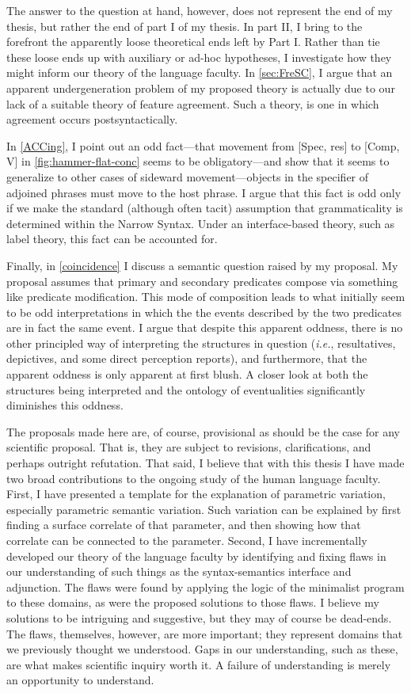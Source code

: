\documentclass[MilwayThesis]{subfiles}
\begin{document}
The answer to the question at hand, however, does not represent the end of my thesis, but rather the end of part I of my thesis.
In part II, I bring to the forefront the apparently loose theoretical ends left by Part I.
Rather than tie these loose ends up with auxiliary or ad-hoc hypotheses, I investigate how they might inform our theory of the language faculty.
In \cref{sec:FreSC}, I argue that an apparent undergeneration problem of my proposed theory is actually due to our lack of a suitable theory of feature agreement.
Such a theory, is one in which agreement occurs postsyntactically.

In \cref{ACCing}, I point out an odd fact---that movement from [Spec, res] to [Comp, V] in \cref{fig:hammer-flat-conc} seems to be obligatory---and show that it seems to generalize to other cases of sideward movement---objects in the specifier of adjoined phrases must move to the host phrase.
I argue that this fact is odd only if we make the standard (although often tacit) assumption that grammaticality is determined within the Narrow Syntax.
Under an interface-based theory, such as label theory, this fact can be accounted for.

Finally, in \cref{coincidence} I discuss a semantic question raised by my proposal.
My proposal assumes that primary and secondary predicates compose via something like predicate modification. 
This mode of composition leads to what initially seem to be odd interpretations in which the the events described by the two predicates are in fact the same event.
I argue that despite this apparent oddness, there is no other principled way of interpreting the structures in question (\textit{i.e.}, resultatives, depictives, and some direct perception reports), and furthermore, that the apparent oddness is only apparent at first blush.
A closer look at both the structures being interpreted and the ontology of eventualities significantly diminishes this oddness.

The proposals made here are, of course, provisional as should be the case for any scientific proposal.
That is, they are subject to revisions, clarifications, and perhaps outright refutation.
That said, I believe that with this thesis I have made two broad contributions to the ongoing study of the human language faculty.
First, I have presented a template for the explanation of parametric variation, especially parametric semantic variation.
Such variation can be explained by first finding a surface correlate of that parameter, and then showing how that correlate can be connected to the parameter.
Second, I have incrementally developed our theory of the language faculty by identifying and fixing flaws in our understanding of such things as the syntax-semantics interface and adjunction.
The flaws were found by applying the logic of the minimalist program to these domains, as were the proposed solutions to those flaws.
I believe my solutions to be intriguing and suggestive, but they may of course be dead-ends.
The flaws, themselves, however, are more important; they represent domains that we previously thought we understood.
Gaps in our understanding, such as these, are what makes scientific inquiry worth it.
A failure of understanding is merely an opportunity to understand.
\end{document}
